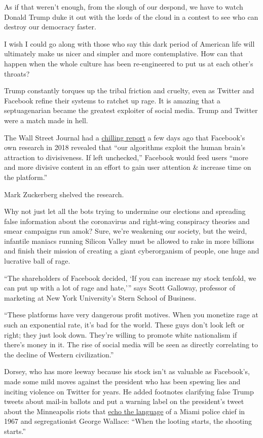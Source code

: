 As if that weren't enough, from the slough of our despond, we have to
watch Donald Trump duke it out with the lords of the cloud in a contest
to see who can destroy our democracy faster.

I wish I could go along with those who say this dark period of American
life will ultimately make us nicer and simpler and more contemplative.
How can that happen when the whole culture has been re-engineered to put
us at each other's throats?

Trump constantly torques up the tribal friction and cruelty, even as
Twitter and Facebook refine their systems to ratchet up rage. It is
amazing that a septuagenarian became the greatest exploiter of social
media. Trump and Twitter were a match made in hell.

The Wall Street Journal had a
\href{https://www.wsj.com/articles/facebook-knows-it-encourages-division-top-executives-nixed-solutions-11590507499}{chilling
report} a few days ago that Facebook's own research in 2018 revealed
that ``our algorithms exploit the human brain's attraction to
divisiveness. If left unchecked,'' Facebook would feed users ``more and
more divisive content in an effort to gain user attention \& increase
time on the platform.''

Mark Zuckerberg shelved the research.

Why not just let all the bots trying to undermine our elections and
spreading false information about the coronavirus and right-wing
conspiracy theories and smear campaigns run amok? Sure, we're weakening
our society, but the weird, infantile maniacs running Silicon Valley
must be allowed to rake in more billions and finish their mission of
creating a giant cyberorganism of people, one huge and lucrative ball of
rage.

``The shareholders of Facebook decided, `If you can increase my stock
tenfold, we can put up with a lot of rage and hate,''' says Scott
Galloway, professor of marketing at New York University's Stern School
of Business.

``These platforms have very dangerous profit motives. When you monetize
rage at such an exponential rate, it's bad for the world. These guys
don't look left or right; they just look down. They're willing to
promote white nationalism if there's money in it. The rise of social
media will be seen as directly correlating to the decline of Western
civilization.''

Dorsey, who has more leeway because his stock isn't as valuable as
Facebook's, made some mild moves against the president who has been
spewing lies and inciting violence on Twitter for years. He added
footnotes clarifying false Trump tweets about mail-in ballots and put a
warning label on the president's tweet about the Minneapolis riots that
\href{https://www.nytimes3xbfgragh.onion/aponline/2020/05/29/us/ap-us-trump-minneapolis-death-quote-.html}{echo
the language} of a Miami police chief in 1967 and segregationist George
Wallace: ``When the looting starts, the shooting starts.''

